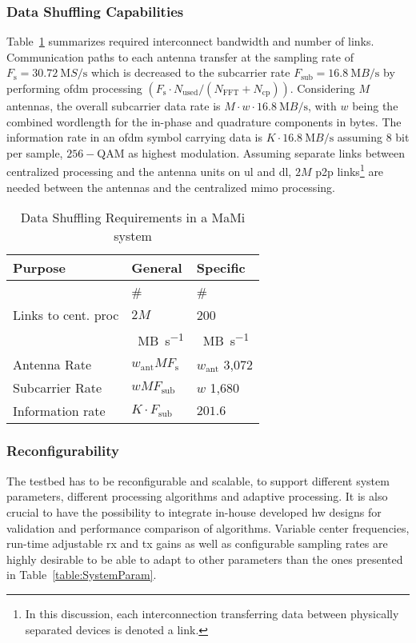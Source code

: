 \documentclass[journal]{IEEEtran}
\begin{document}
\subsubsection{Data Shuffling Capabilities}
Table~\ref{tab:data_shuffling_requirements} summarizes required interconnect bandwidth and number of links.
Communication paths to each antenna transfer at the sampling rate of %
$F_\text{s}=\SI{30.72}{\mega S\per\second}$ which is decreased to the subcarrier rate %
$F_\text{sub}=\SI{16.8}{\mega B\per\second}$ by performing \gls{ofdm} processing $\left(F_\text{s}\cdot N_\text{used}/(N_\text{FFT}+N_\text{cp})\right)$.
Considering $M$ antennas, the overall subcarrier data rate is $M\cdot w\cdot\SI{16.8}{\mega B\per\second}$, with $w$ being the combined wordlength for the in-phase and quadrature components in bytes. %
The information rate in an \gls{ofdm} symbol carrying data is $K\cdot\SI{16.8}{\mega B\per\second}$ assuming $8$ bit per sample, \ie $256-$QAM as highest modulation.
Assuming separate links between centralized processing and the antenna units on \gls{ul} and \gls{dl}, $2M$ \gls{p2p} links\footnote{In this discussion, each interconnection transferring data between physically separated devices is denoted a  link.} are needed between the antennas and the centralized \gls{mimo} processing.
%
\begin{table}[t]
	\centering
	\footnotesize
	\caption{Data Shuffling Requirements in a MaMi system}
	\noindent\begin{tabular}{lll}
		\toprule
		\textbf{Purpose} & \textbf{General} & \textbf{Specific} \\
		\midrule
		& \# & \# \\
		Links to cent. proc & $2M$ & 200\\
		\midrule
		& \SI{}{MB\per s} & \SI{}{MB\per s}\\
		Antenna Rate & $w_\text{ant}MF_\text{s}$ & $w_\text{ant}$ 3,072\\
		Subcarrier Rate & $wMF_\text{sub}$ & $w$ 1,680\\
		Information rate & $K\cdot F_\text{sub}$ & $201.6$ \\
%
%
%
		\bottomrule
	\end{tabular}
	\label{tab:data_shuffling_requirements}
\end{table}


\subsubsection{Reconfigurability}
%
The testbed has to be reconfigurable and scalable, to support different system parameters, different processing algorithms and adaptive processing.
It is also crucial to have the possibility to integrate in-house developed \gls{hw} designs for validation and performance comparison of algorithms.
%
%
Variable center frequencies, run-time adjustable \gls{rx} and \gls{tx} gains as well as configurable sampling rates are highly desirable to be able to adapt to other parameters than the ones presented in Table~\ref{table:SystemParam}.
\end{document}
